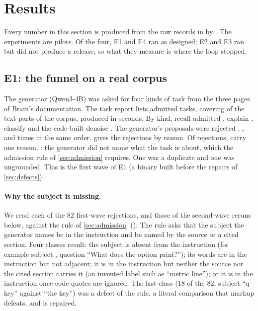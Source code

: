 
\section{Results}\label{sec:results}

Every number in this section is produced from the raw records in 
by . The experiments are pilots. Of the four, E1 and E4 ran
as designed; E2 and E3 ran but did not produce a release, so what they measure is where
the loop stopped.

\subsection{E1: the funnel on a real corpus}\label{sec:e1}

The generator (Qwen3-4B) was asked for four kinds of task from the three pages of
Brain's documentation. The task report lists \mEOneTasks{} admitted tasks, covering
\mEOneParts{} of the \mEOnePartsTotal{} text parts of the corpus,
produced in \mEOneElapsedSecs{} seconds. By kind,
recall admitted \mEOneAdmittedRecall, explain \mEOneAdmittedExplain, classify
\mEOneAdmittedClassify{} and the code-built denoise \mEOneAdmittedDenoise.
The generator's proposals were rejected \mEOneRejectedRecall, \mEOneRejectedExplain,
\mEOneRejectedClassify{} and \mEOneRejectedDenoise{} times in the same order.
 gives the rejections by reason. Of \mEOneRejectedTotal{} rejections,
\mEOneReasonNoSubject{} carry one reason, : the generator did not
name what the task is about, which the admission rule of \cref{sec:admission}
requires. One was a duplicate and one was ungrounded.
This is the first wave of E1 (a binary built before the repairs of \cref{sec:defects}).

\paragraph{Why the subject is missing.} We read each of the 82 first-wave rejections, and
those of the second-wave reruns below, against the rule of \cref{sec:admission}
(). The rule asks that the subject the generator names
be in the instruction and be named by the source or a cited section. Four classes result:
the subject is absent from the instruction (for example subject , question
``What does the  option print?''); its words are in the instruction but not
adjacent; it is in the instruction but neither the source nor the cited section carries it
(an invented label such as ``metric line''); or it is in the instruction once code quotes
are ignored. The last class (18 of the 82, subject ``q key'' against ``the  key'')
was a defect of the rule, a literal comparison that markup defeats, and is repaired.

